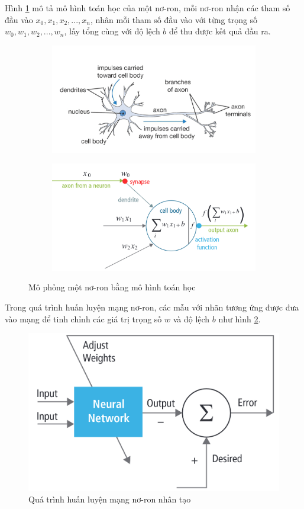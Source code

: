 Hình \ref{fig:math-ann} mô tả mô hình toán học của một nơ-ron, mỗi nơ-ron nhận các tham số đầu vào $x_0, x_1, x_2, ..., x_n$, nhân mỗi tham số đầu vào với từng trọng số $w_0, w_1, w_2, ..., w_n$, lấy tổng cùng với độ lệch $b$ để thu được kết quả đầu ra.

\begin{figure}[H]
	\centering
	\begin{subfigure}{.5\textwidth}
		\includegraphics[width=0.9\linewidth]{images/real-neural.png}
	\end{subfigure}%
	\begin{subfigure}{.5\textwidth}
		\includegraphics[width=0.9\linewidth]{images/artificial-neural.png}
	\end{subfigure}
	\caption{Mô phỏng một nơ-ron bằng mô hình toán học \cite{karpathy}}
	\label{fig:math-ann}
\end{figure}

Trong quá trình huấn luyện mạng nơ-ron, các mẫu với nhãn tương ứng được đưa vào mạng để tinh chỉnh các giá trị trọng số $w$ và độ lệch $b$ như hình \ref{fig:artificial-neural-training}.

\begin{figure}[h]
	\centering
	\includegraphics[width=0.5\linewidth]{images/artificial-neural-training}
	\caption{Quá trình huấn luyện mạng nơ-ron nhân tạo}
	\label{fig:artificial-neural-training}
\end{figure}



